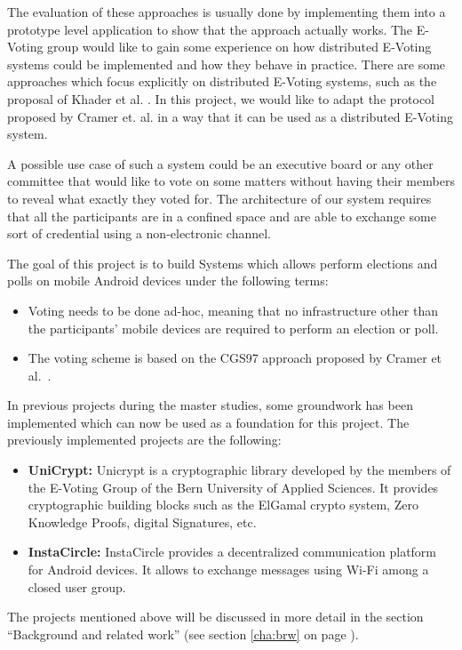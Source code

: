\documentclass[numbers=noenddot, abstract=on]{scrreprt}
\newcommand{\myref}[1]{(see section \ref{#1} on page \pageref{#1})}
\begin{document}
The evaluation of these approaches is usually done by implementing them into a
prototype level application to show that the approach actually works. The
E-Voting group would like to gain some experience on how distributed E-Voting
systems could be implemented and how they behave in practice. There are some
approaches which focus explicitly on distributed E-Voting systems, such as the
proposal of Khader et al. \cite{HKRS12}. In this project, we would like to adapt
the protocol proposed by Cramer et. al. \cite{CGS97} in a way that it can be
used as a distributed E-Voting system.

A possible use case of such a system could be an executive board or any other
committee that would like to vote on some matters without having their members
to reveal what exactly they voted for. The architecture of our system requires
that all the participants are in a confined space and are able to exchange some
sort of credential using a non-electronic channel.

The goal of this project is to build Systems which allows perform elections and
polls on mobile Android devices under the following terms:
\begin{itemize}
  \item Voting needs to be done ad-hoc, meaning that no infrastructure other
  than the participants' mobile devices are required to perform an election or
  poll.
  \item The voting scheme is based on the CGS97 approach proposed by Cramer et
  al.~\cite{CGS97}.
\end{itemize}

In previous projects during the master studies, some groundwork has been
implemented which can now be used as a foundation for this project. The
previously implemented projects are the following:
\begin{itemize}
  \item \textbf{UniCrypt:} Unicrypt is a cryptographic library developed by the
  members of the E-Voting Group of the Bern University of Applied Sciences. It
  provides cryptographic building blocks such as the ElGamal crypto system, Zero
  Knowledge Proofs, digital Signatures, etc. 
  \item \textbf{InstaCircle: } InstaCircle provides a decentralized
  communication platform for Android devices. It allows to exchange messages
  using Wi-Fi among a closed user group.
\end{itemize}
The projects mentioned above will be discussed in more detail in the section
``Background and related work'' \myref{cha:brw}.
\end{document}

